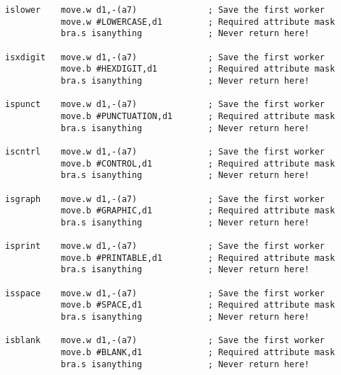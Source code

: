 \begin{lstlisting}[caption={Character attributes library - \protect\url{charAttr_asm_in}}]
islower    move.w d1,-(a7)              ; Save the first worker
           move.w #LOWERCASE,d1         ; Required attribute mask
           bra.s isanything             ; Never return here!

isxdigit   move.w d1,-(a7)              ; Save the first worker
           move.b #HEXDIGIT,d1          ; Required attribute mask
           bra.s isanything             ; Never return here!

ispunct    move.w d1,-(a7)              ; Save the first worker
           move.b #PUNCTUATION,d1       ; Required attribute mask
           bra.s isanything             ; Never return here!

iscntrl    move.w d1,-(a7)              ; Save the first worker
           move.b #CONTROL,d1           ; Required attribute mask
           bra.s isanything             ; Never return here!

isgraph    move.w d1,-(a7)              ; Save the first worker
           move.b #GRAPHIC,d1           ; Required attribute mask
           bra.s isanything             ; Never return here!

isprint    move.w d1,-(a7)              ; Save the first worker
           move.b #PRINTABLE,d1         ; Required attribute mask
           bra.s isanything             ; Never return here!

isspace    move.w d1,-(a7)              ; Save the first worker
           move.b #SPACE,d1             ; Required attribute mask
           bra.s isanything             ; Never return here!

isblank    move.w d1,-(a7)              ; Save the first worker
           move.b #BLANK,d1             ; Required attribute mask
           bra.s isanything             ; Never return here!

\end{lstlisting}

